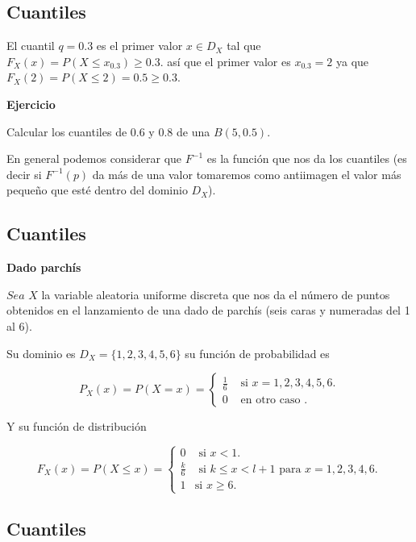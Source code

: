 \documentclass[]{book}
\begin{document}
\hypertarget{cuantiles-3}{%
\subsection{Cuantiles}\label{cuantiles-3}}

El cuantil \(q=0.3\) es el primer valor \(x\in D_X\) tal que \(F_X(x)=P(X\leq x_{0.3})\geq 0.3.\) así que el primer valor es \(x_{0.3}=2\) ya que \(F_X(2)=P(X\leq 2)=0.5 \geq 0.3\).

\textbf{Ejercicio}

Calcular los cuantiles de \(0.6\) y \(0.8\) de una \(B(5,0.5).\)

En general podemos considerar que \(F^{-1}\) es la función que nos da los cuantiles (es decir si \(F^{-1}(p)\) da más de una valor tomaremos como antiimagen el valor más pequeño que esté dentro del dominio \(D_X\)).

\hypertarget{cuantiles-4}{%
\subsection{Cuantiles}\label{cuantiles-4}}

\textbf{Dado parchís}

\(Sea\) \(X\) la variable aleatoria uniforme discreta que nos da el número de puntos obtenidos en el lanzamiento de una dado de parchís (seis caras y numeradas del 1 al 6).

Su dominio es \(D_X=\{1,2,3,4,5,6\}\) su función de probabilidad es

\[
P_X(x)=P(X=x)=
\left\{
\begin{array}{ll}
 \frac{1}{6} & \mbox{ si } x=1,2,3,4,5,6. \\
0 & \mbox{ en otro caso }.
\end{array}
\right.
\]

Y su función de distribución

\[
F_X(x)= P(X\leq x)=
\left\{
\begin{array}{ll}
0 & \mbox{ si } x<1. \\
\frac{k}{6} & \mbox{ si } k\leq x< l+1 \mbox{ para } x= 1,2,3,4,6. \\
 1 & \mbox{si  } x \geq 6.
\end{array}
\right.
\]

\hypertarget{cuantiles-5}{%
\subsection{Cuantiles}\label{cuantiles-5}}
\end{document}
